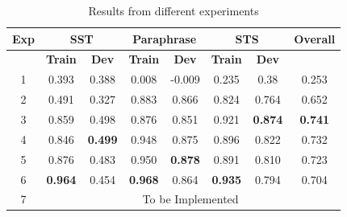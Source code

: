 \documentclass{article}
\begin{document}
\begin{table}[htp]
\centering
\begin{tabular}{|c|ccccccc|}
\hline
\textbf{Exp} &
  \multicolumn{2}{c|}{\textbf{SST}} &
  \multicolumn{2}{c|}{\textbf{Paraphrase}} &
  \multicolumn{2}{c|}{\textbf{STS}} &
  \textbf{Overall} \\ \hline
 &
  \multicolumn{1}{c|}{\textbf{Train}} &
  \multicolumn{1}{c|}{\textbf{Dev}} &
  \multicolumn{1}{c|}{\textbf{Train}} &
  \multicolumn{1}{c|}{\textbf{Dev}} &
  \multicolumn{1}{c|}{\textbf{Train}} &
  \multicolumn{1}{c|}{\textbf{Dev}} &
   \\ \hline
1 &
  \multicolumn{1}{c|}{0.393} &
  \multicolumn{1}{c|}{0.388} &
  \multicolumn{1}{c|}{0.008} &
  \multicolumn{1}{c|}{-0.009} &
  \multicolumn{1}{c|}{0.235} &
  \multicolumn{1}{c|}{0.38} &
  0.253 \\ \hline
2 &
  \multicolumn{1}{c|}{0.491} &
  \multicolumn{1}{c|}{0.327} &
  \multicolumn{1}{c|}{0.883} &
  \multicolumn{1}{c|}{0.866} &
  \multicolumn{1}{c|}{0.824} &
  \multicolumn{1}{c|}{0.764} &
  0.652 \\ \hline
  3 &
  \multicolumn{1}{c|}{{0.859}} &
  \multicolumn{1}{c|}{0.498} &
  \multicolumn{1}{c|}{0.876} &
  \multicolumn{1}{c|}{0.851} &
  \multicolumn{1}{c|}{0.921} &
  \multicolumn{1}{c|}{\textbf{0.874}} &
  \textbf{0.741} \\ \hline
4 &
  \multicolumn{1}{c|}{0.846} &
  \multicolumn{1}{c|}{\textbf{0.499}} &
  \multicolumn{1}{c|}{0.948} &
  \multicolumn{1}{c|}{0.875} &
  \multicolumn{1}{c|}{0.896} &
  \multicolumn{1}{c|}{0.822} &
  0.732 \\ \hline
5 &
  \multicolumn{1}{c|}{0.876} &
  \multicolumn{1}{c|}{0.483} &
  \multicolumn{1}{c|}{0.950} &
  \multicolumn{1}{c|}{\textbf{0.878}} &
  \multicolumn{1}{c|}{0.891} &
  \multicolumn{1}{c|}{0.810} &
  0.723 \\ \hline
6 &
  \multicolumn{1}{c|}{\textbf{0.964}} &
  \multicolumn{1}{c|}{0.454} &
  \multicolumn{1}{c|}{\textbf{0.968}} &
  \multicolumn{1}{c|}{0.864} &
  \multicolumn{1}{c|}{\textbf{0.935}} &
  \multicolumn{1}{c|}{0.794} &
  0.704 \\ \hline
7 &
  \multicolumn{7}{c|}{To be Implemented} \\ \hline
\end{tabular}
\caption{Results from different experiments}
\label{experiment-results}
\end{table}
\end{document}
